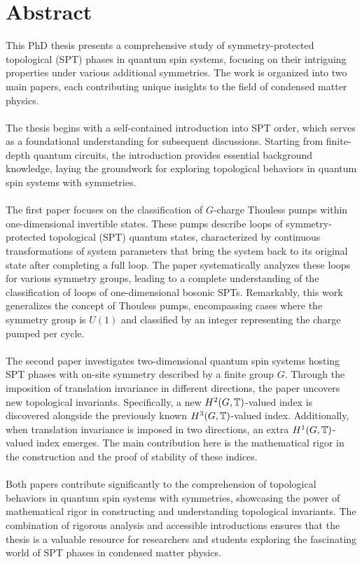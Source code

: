 \chapter{Abstract}                                 \label{ch:abstract}

This PhD thesis presents a comprehensive study of symmetry-protected topological (SPT) phases in quantum spin systems, focusing on their intriguing properties under various additional symmetries. The work is organized into two main papers, each contributing unique insights to the field of condensed matter physics.
\\\\
The thesis begins with a self-contained introduction into SPT order, which serves as a foundational understanding for subsequent discussions. Starting from finite-depth quantum circuits, the introduction provides essential background knowledge, laying the groundwork for exploring topological behaviors in quantum spin systems with symmetries.
\\\\
The first paper focuses on the classification of $G$-charge Thouless pumps within one-dimensional invertible states. These pumps describe loops of symmetry-protected topological (SPT) quantum states, characterized by continuous transformations of system parameters that bring the system back to its original state after completing a full loop. The paper systematically analyzes these loops for various symmetry groups, leading to a complete understanding of the classification of loops of one-dimensional bosonic SPTs. Remarkably, this work generalizes the concept of Thouless pumps, encompassing cases where the symmetry group is $U(1)$ and classified by an integer representing the charge pumped per cycle.
\\\\
The second paper investigates two-dimensional quantum spin systems hosting SPT phases with on-site symmetry described by a finite group $G$. Through the imposition of translation invariance in different directions, the paper uncovers new topological invariants. Specifically, a new $H^2(G,\mathbb T)$-valued index is discovered alongside the previously known $H^3(G,\mathbb T)$-valued index. Additionally, when translation invariance is imposed in two directions, an extra $H^1(G,\mathbb T)$-valued index emerges. The main contribution here is the mathematical rigor in the construction and the proof of stability of these indices.
\\\\
Both papers contribute significantly to the comprehension of topological behaviors in quantum spin systems with symmetries, showcasing the power of mathematical rigor in constructing and understanding topological invariants. The combination of rigorous analysis and accessible introductions ensures that the thesis is a valuable resource for researchers and students exploring the fascinating world of SPT phases in condensed matter physics.




\cleardoublepage

